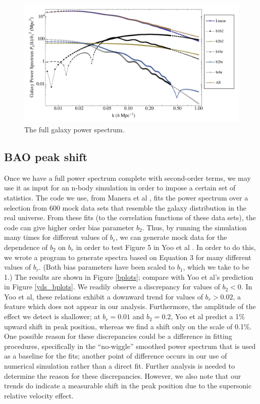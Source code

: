 \documentclass[12pt]{article}
\begin{document}
\begin{figure}[h]
	\centering
	\includegraphics[width=16cm]{PSbd}
	\caption{The full galaxy power spectrum.}
	\label{PSbd}
\end{figure}

\subsection{BAO peak shift}
Once we have a full power spectrum complete with second-order terms, we may use it as input for an n-body simulation in order to impose a certain set of statistics. The code we use, from Manera et al \cite{Manera}, fits the power spectrum over a selection from 600 mock data sets that resemble the galaxy distribution in the real universe. From these fits (to the correlation functions of these data sets), the code can give higher order bias parameter $b_{2}$. Thus, by running the simulation many times for different values of $b_{r}$, we can generate mock data for the dependence of $b_{2}$ on $b_{r}$ in order to test Figure 5 in Yoo et al \cite{Yooetal}. In order to do this, we wrote a program to generate spectra based on Equation 3 for many different values of $b_{r}$. (Both bias parameters have been scaled to $b_{1}$, which we take to be 1.) The results are shown in Figure \ref{bplots}; compare with Yoo et al's prediction in Figure \ref{yds_bplots}. We readily observe a discrepancy for values of $b_{2}<0$. In Yoo et al, these relations exhibit a downward trend for values of $b_{r}>0.02$, a feature which does not appear in our analysis. Furthermore, the amplitude of the effect we detect is shallower; at $b_{r}=0.01$ and $b_{2}=0.2$, Yoo et al predict a 1\% upward shift in peak position, whereas we find a shift only on the scale of 0.1\%. One possible reason for these discrepancies could be a difference in fitting procedures, specifically in the ``no-wiggle'' smoothed power spectrum that is used as a baseline for the fits; another point of difference occurs in our use of numerical simulation rather than a direct fit. Further analysis is needed to determine the reason for these discrepancies. However, we also note that our trends do indicate a measurable shift in the peak position due to the supersonic relative velocity effect.
\end{document}
